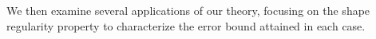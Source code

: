 \documentclass[paper=a4, fontsize=11pt]{scrartcl}
\begin{document}


We then examine several applications of our theory, focusing on the shape regularity property to characterize the error bound attained in each case.
\end{document}
